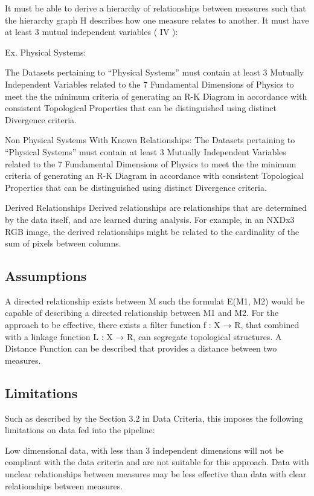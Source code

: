 It must be able to derive a hierarchy of relationships between measures such that the hierarchy graph H describes how one measure relates to another.
It must have at least 3 mutual independent variables ( IV ):

Ex. Physical Systems:

The Datasets pertaining to “Physical Systems” must contain at least 3 Mutually Independent Variables related to the 7 Fundamental Dimensions of Physics to meet the the minimum criteria of  generating an  R-K Diagram in accordance with consistent Topological Properties that can be distinguished using distinct Divergence criteria.

Non Physical Systems With Known Relationships:
The Datasets pertaining to “Physical Systems” must contain at least 3 Mutually Independent Variables related to the 7 Fundamental Dimensions of Physics to meet the the minimum criteria of  generating an  R-K Diagram in accordance with consistent Topological Properties that can be distinguished using distinct Divergence criteria.

Derived Relationships
Derived relationships are relationships that are determined by the data itself, and are learned during analysis. For example, in an NXDx3 RGB image, the derived relationships might be related to the cardinality of the sum of pixels between columns.

\subsection{Assumptions}
A directed relationship exists between M such the formulat E(M1, M2) would be capable of describing a directed relationship between M1 and M2.
For the approach to be effective, there exists a filter function f : X → R, that combined with a linkage function L : X → R, can segregate topological structures.
A Distance Function can be described that provides a distance between two measures.

\subsection{Limitations}
Such as described by the Section 3.2 in Data Criteria, this imposes the following limitations on data fed into the pipeline:

Low dimensional data, with less than 3 independent dimensions will not be compliant with the data criteria and are not suitable for this approach.
Data with unclear relationships between measures may be less effective than data with clear relationships between measures.

